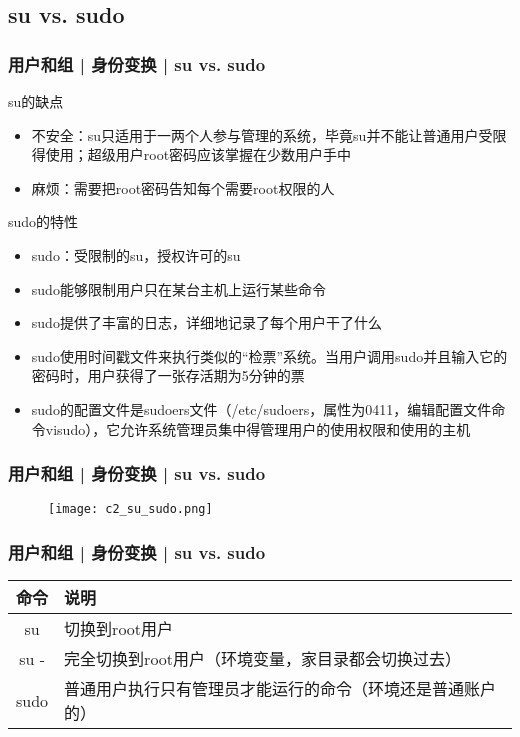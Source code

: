 \subsection{su vs. sudo}
\begin{frame}
  \frametitle{用户和组 | 身份变换 | su vs. sudo}
  \begin{block}{su的缺点}
    \begin{itemize}
      \item 不安全：su只适用于一两个人参与管理的系统，毕竟su并不能让普通用户受限得使用；超级用户root密码应该掌握在少数用户手中
      \item 麻烦：需要把root密码告知每个需要root权限的人
    \end{itemize}
  \end{block}
  \pause
  \begin{block}{sudo的特性}
    \begin{itemize}
      \item sudo：受限制的su，授权许可的su
      \item sudo能够限制用户只在某台主机上运行某些命令
      \item sudo提供了丰富的日志，详细地记录了每个用户干了什么
      \item sudo使用时间戳文件来执行类似的“检票”系统。当用户调用sudo并且输入它的密码时，用户获得了一张存活期为5分钟的票
      \item sudo的配置文件是sudoers文件（/etc/sudoers，属性为0411，编辑配置文件命令visudo），它允许系统管理员集中得管理用户的使用权限和使用的主机
    \end{itemize}
  \end{block}
\end{frame}

\begin{frame}
  \frametitle{用户和组 | 身份变换 | su vs. sudo}
  \begin{figure}
    \centering
    \texttt{[image: c2\_su\_sudo.png]}
  \end{figure}
\end{frame}

\begin{frame}
  \frametitle{用户和组 | 身份变换 | \alert{su vs. sudo}}
  \begin{table}
    \centering
    \begin{tabular}{cl}
      \hline
      \rowcolor{blue!50}命令 & 说明\\
      \hline
      su & 切换到root用户\\
      su - & 完全切换到root用户（环境变量，家目录都会切换过去）\\
      sudo & 普通用户执行只有管理员才能运行的命令（环境还是普通账户的）\\
      \hline
    \end{tabular}
  \end{table}
\end{frame}

